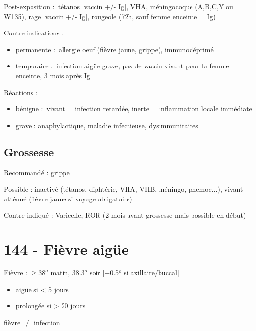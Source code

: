 Post-exposition : tétanos [vaccin +/- Ig], VHA, méningocoque (A,B,C,Y ou W135), rage [vaccin +/-
Ig], rougeole (72h, sauf femme enceinte = Ig)

Contre indications :
\begin{itemize}
  \item permanente : allergie oeuf (fièvre jaune, grippe), immunodéprimé
    \item temporaire : infection aigüe grave, pas de vaccin vivant pour la femme
      enceinte, 3 mois après Ig
\end{itemize}

Réactions :
\begin{itemize}
  \item bénigne : vivant = infection retardée, inerte = inflammation locale
    immédiate
    \item grave : anaphylactique, maladie infectieuse, dysimmunitaires
\end{itemize}

\subsection{Grossesse}%
\label{sub:grossesse}

Recommandé : grippe

Possible : inactivé (tétanos, diphtérie, VHA, VHB, méningo, pnemoc...), vivant
atténué (fièvre jaune si voyage obligatoire)

Contre-indiqué : Varicelle, ROR (2 mois avant grossesse mais possible en début)
\section{144 - Fièvre aigüe}

Fièvre : \(\ge 38^{o}\) matin, \(38.3^{o}\) soir [+0.5$^{o}$ si axillaire/buccal]
\begin{itemize}
\item aigüe si \textless{} 5 jours
\item prolongée si \textgreater{} 20 jours
\end{itemize}

\danger fièvre \(\neq\) infection


